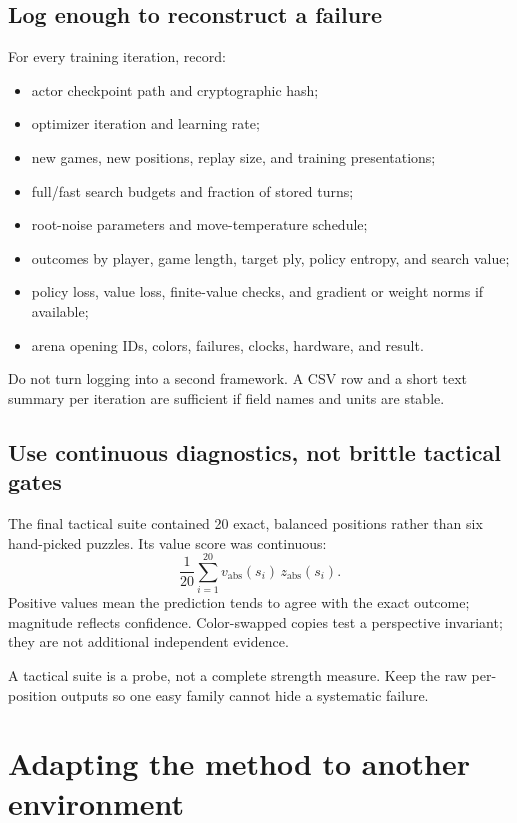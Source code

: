 \documentclass[10.5pt,letterpaper]{article}
\begin{document}
\subsection{Log enough to reconstruct a failure}

For every training iteration, record:
\begin{itemize}
  \item actor checkpoint path and cryptographic hash;
  \item optimizer iteration and learning rate;
  \item new games, new positions, replay size, and training presentations;
  \item full/fast search budgets and fraction of stored turns;
  \item root-noise parameters and move-temperature schedule;
  \item outcomes by player, game length, target ply, policy entropy, and search
        value;
  \item policy loss, value loss, finite-value checks, and gradient or weight
        norms if available;
  \item arena opening IDs, colors, failures, clocks, hardware, and result.
\end{itemize}

Do not turn logging into a second framework. A CSV row and a short text summary
per iteration are sufficient if field names and units are stable.

\subsection{Use continuous diagnostics, not brittle tactical gates}

The final tactical suite contained 20 exact, balanced positions rather than six
hand-picked puzzles. Its value score was continuous:
\[
  \frac{1}{20}\sum_{i=1}^{20}
  v_{\mathrm{abs}}(s_i)\,z_{\mathrm{abs}}(s_i).
\]
Positive values mean the prediction tends to agree with the exact outcome;
magnitude reflects confidence. Color-swapped copies test a perspective
invariant; they are not additional independent evidence.

A tactical suite is a probe, not a complete strength measure. Keep the raw
per-position outputs so one easy family cannot hide a systematic failure.

\section{Adapting the method to another environment}
\label{sec:adapt}
\end{document}
